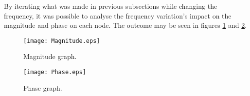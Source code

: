 \indent

By iterating what was made in previous subsections while changing the frequency, it was possible to analyse the frequency variation's impact on the magnitude and phase on each node. The outcome may be seen in figures \ref{fig:FreqMagOc} and \ref{fig:FreqPhOc}.


\begin{figure}[H] \centering
    \texttt{[image: Magnitude.eps]}
    \caption{Magnitude graph.}
    \label{fig:FreqMagOc}
\end{figure}



\begin{figure}[H] \centering
    \texttt{[image: Phase.eps]}
    \caption{Phase graph.}
    \label{fig:FreqPhOc}
\end{figure}
